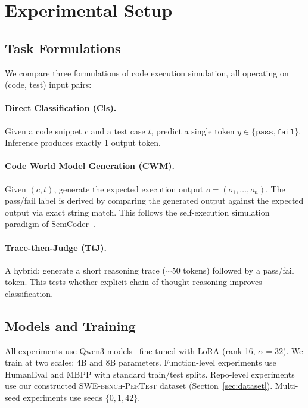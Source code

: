 \documentclass[11pt,a4paper]{article}
\begin{document}
\section{Experimental Setup}
\label{sec:method}

\subsection{Task Formulations}

We compare three formulations of code execution simulation, all operating on (code, test) input pairs:

\paragraph{Direct Classification (Cls).}
Given a code snippet $c$ and a test case $t$, predict a single token $y \in \{\texttt{pass}, \texttt{fail}\}$.
Inference produces exactly 1 output token.

\paragraph{Code World Model Generation (CWM).}
Given $(c, t)$, generate the expected execution output $o = (o_1, \ldots, o_n)$.
The pass/fail label is derived by comparing the generated output against the expected output via exact string match.
This follows the self-execution simulation paradigm of SemCoder~\cite{ding2024semcoder}.

\paragraph{Trace-then-Judge (TtJ).}
A hybrid: generate a short reasoning trace (${\sim}50$ tokens) followed by a pass/fail token.
This tests whether explicit chain-of-thought reasoning improves classification.

\subsection{Models and Training}

All experiments use Qwen3 models~\cite{qwen2025qwen3} fine-tuned with LoRA (rank 16, $\alpha{=}32$).
We train at two scales: 4B and 8B parameters.
Function-level experiments use HumanEval and MBPP with standard train/test splits.
Repo-level experiments use our constructed \textsc{SWE-bench-PerTest} dataset (Section~\ref{sec:dataset}).
Multi-seed experiments use seeds $\{0, 1, 42\}$.
\end{document}
